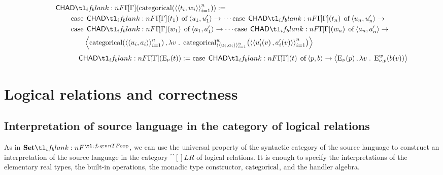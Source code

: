 \documentclass[11pt,a4paper]{article}
\theoremstyle{definition}
\theoremstyle{remark}
\begin{document}
\begin{equation}
  \label{eq:chad-code-transformation-categorical}
  \begin{aligned}
  &\Fun[np]{ \chad[\Gamma] }{
    \fn[n]{ \opn[b]{categorical} }{ \tuple{ \tuple{ t_{i}, w_{i} } }_{i = 1}^{n} }
  } :=
    \\
  & \qquad
    \opn[b]{case} \; \Fun[nn]{ \chad[\Gamma] }{ t_{1} } \; \opn[b]{of}
    \tuple{ u_{1}, u_{1}' } \to
    \cdots
    \opn[b]{case} \; \Fun[nn]{ \chad[\Gamma] }{ t_{n} } \; \opn[b]{of}
    \tuple{ u_{n}, u_{n}' } \to
    \\
  & \qquad
    \opn[b]{case} \; \Fun[nn]{ \chad[\Gamma] }{ w_{1} } \; \opn[b]{of}
    \tuple{ a_{1}, a_{1}' } \to
    \cdots
    \opn[b]{case} \; \Fun[nn]{ \chad[\Gamma] }{ w_{n} } \; \opn[b]{of}
    \tuple{ a_{n}, a_{n}' } \to
    \\
  & \qquad \qquad
    \tuple{
    \fn[n]{ \opn[b]{categorical} }{ \tuple{ \tuple{ u_{i}, a_{i} } }_{i = 1}^{n} },
    \lambda v \; . \;
    \fn[n]{ \opn[b]{categorical}^{w}_{ \tuple{ \tuple{ u_{i}, a_{i} } }_{i = 1}^{n} } }{
    \tuple{ \tuple{ \fn[n]{ u_{i}' }{ v }, \fn[n]{ a_{i}' }{ v } } }_{i = 1}^{n}
    }
    }
  \end{aligned}
\end{equation}
\begin{equation}
  \label{eq:chad-code-transformation-handler-algebra}\qquad\qquad\qquad
  \Fun[np]{ \chad[\Gamma] }{ \fn[n]{ \opn[b]{E}_{\nu} }{ t } } :=
  \opn[b]{case} \; \Fun[np]{ \chad[\Gamma] }{ t } \; \opn[b]{of}
  \tuple{ p, b } \to
  \tuple{
    \fn[n]{ \opn[b]{E}_{\nu} }{ p },
    \lambda v \; . \; \fn[n]{ \opn[b]{E}^{w}_{\nu, p} }{ \fn[n]{ b }{ v } }
  }
\end{equation}


\section{Logical relations and correctness}

\subsection{Interpretation of source language in the category of logical relations}
\label{sec:interpretation-of-source-language-in-lr}

As in \( \Set \), we can use the universal property of the syntactic category of the source language to construct an interpretation of the source language in the category \( \cat[]{LR} \) of logical relations. It is enough to specify the interpretations of the elementary real types, the built-in operations, the monadic type constructor, \( \opn[b]{categorical} \), and the handler algebra.
\end{document}
